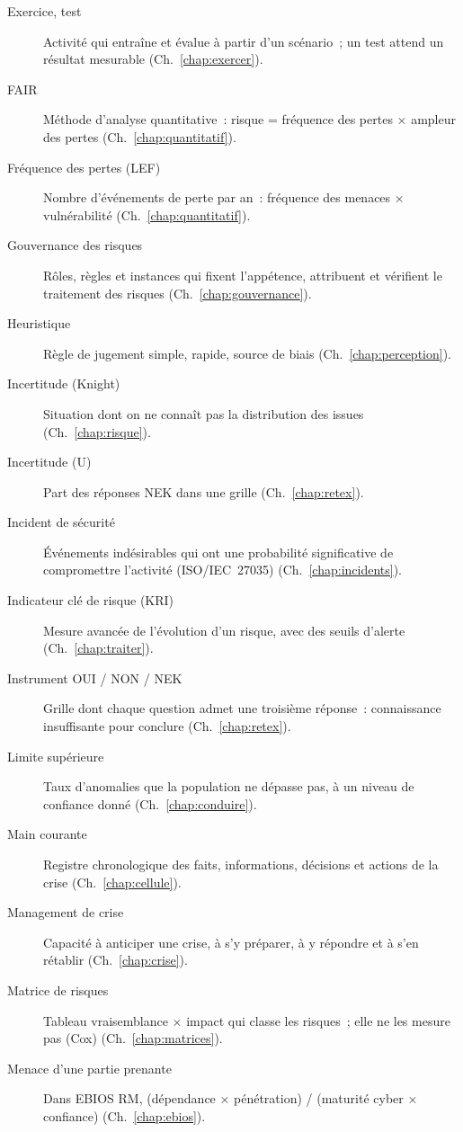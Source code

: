 \begin{description}
    \item[Exercice, test] Activité qui entraîne et évalue à partir d'un scénario~; un test attend un résultat mesurable (Ch.~\ref{chap:exercer}).
    \item[FAIR] Méthode d'analyse quantitative~: risque = fréquence des pertes × ampleur des pertes (Ch.~\ref{chap:quantitatif}).
    \item[Fréquence des pertes (LEF)] Nombre d'événements de perte par an~: fréquence des menaces × vulnérabilité (Ch.~\ref{chap:quantitatif}).
    \item[Gouvernance des risques] Rôles, règles et instances qui fixent l'appétence, attribuent et vérifient le traitement des risques (Ch.~\ref{chap:gouvernance}).
    \item[Heuristique] Règle de jugement simple, rapide, source de biais (Ch.~\ref{chap:perception}).
    \item[Incertitude (Knight)] Situation dont on ne connaît pas la distribution des issues (Ch.~\ref{chap:risque}).
    \item[Incertitude (U)] Part des réponses NEK dans une grille (Ch.~\ref{chap:retex}).
    \item[Incident de sécurité] Événements indésirables qui ont une probabilité significative de compromettre l'activité (ISO/IEC~27035) (Ch.~\ref{chap:incidents}).
    \item[Indicateur clé de risque (KRI)] Mesure avancée de l'évolution d'un risque, avec des seuils d'alerte (Ch.~\ref{chap:traiter}).
    \item[Instrument OUI / NON / NEK] Grille dont chaque question admet une troisième réponse~: connaissance insuffisante pour conclure (Ch.~\ref{chap:retex}).
    \item[Limite supérieure] Taux d'anomalies que la population ne dépasse pas, à un niveau de confiance donné (Ch.~\ref{chap:conduire}).
    \item[Main courante] Registre chronologique des faits, informations, décisions et actions de la crise (Ch.~\ref{chap:cellule}).
    \item[Management de crise] Capacité à anticiper une crise, à s'y préparer, à y répondre et à s'en rétablir (Ch.~\ref{chap:crise}).
    \item[Matrice de risques] Tableau vraisemblance × impact qui classe les risques~; elle ne les mesure pas (Cox) (Ch.~\ref{chap:matrices}).
    \item[Menace d'une partie prenante] Dans EBIOS RM, (dépendance × pénétration) / (maturité cyber × confiance) (Ch.~\ref{chap:ebios}).

\end{description}
